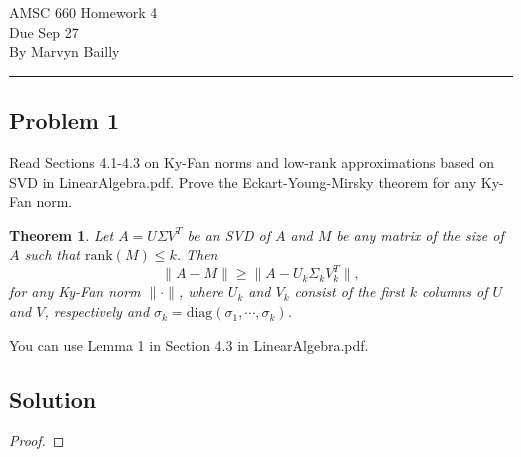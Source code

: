 \documentclass[12pt]{report}
\begin{document}
\large
\begin{center}
AMSC 660 Homework 4\\
Due Sep 27\\
By Marvyn Bailly\\
\end{center}
\normalsize
\hrule



\newtheorem{theorem}{Theorem}



\begin{problem}%
\subsection*{Problem 1}

Read Sections 4.1-4.3 on Ky-Fan norms and low-rank approximations based on SVD in LinearAlgebra.pdf. Prove the Eckart-Young-Mirsky theorem for any Ky-Fan norm.

\begin{theorem}
    Let $A = U\Sigma V^T$ be an SVD of $A$ and $M$ be any matrix of the size of $A$ such that $\text{rank}(M) \leq k$. Then
    \[
         \|A - M \| \geq \|A - U_k\Sigma_k V_k^T \|,
    \]
    for any Ky-Fan norm $\| \cdot \|$, where $U_k$ and $V_k$ consist of the first $k$ columns of $U$ and $V$, respectively and $\sigma_k = \text{diag}(\sigma_1,\cdots,\sigma_k)$. 
\end{theorem}

\noindent You can use Lemma 1 in Section 4.3 in LinearAlgebra.pdf.

\subsection*{Solution}
\begin{proof}


\end{proof}
\end{problem}
\end{document}
